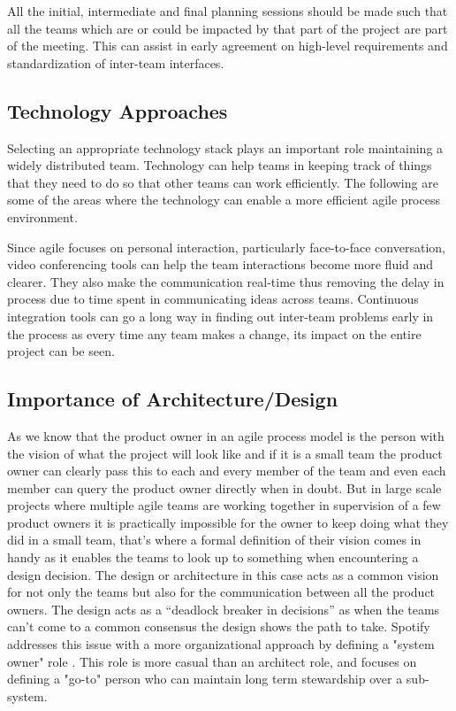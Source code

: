 All the initial, intermediate and final planning sessions should be made such that all the teams which are or could be impacted by that part of the project are part of the meeting.
This can assist in early agreement on high-level requirements and standardization of inter-team interfaces.

\subsection{Technology Approaches} \label{sec:tech_impv}
Selecting an appropriate technology stack plays an important role maintaining a widely distributed team.
Technology can help teams in keeping track of things that they need to do so that other teams can work efficiently.
The following are some of the areas where the technology can enable a more efficient agile process environment.

Since agile focuses on personal interaction, particularly face-to-face conversation, video conferencing tools can help the team interactions become more fluid and clearer.
They also make the communication real-time thus removing the delay in process due to time spent in communicating ideas across teams.
Continuous integration tools can go a long way in finding out inter-team problems early in the process as every time any team makes a change, its impact on the entire project can be seen.

\subsection{Importance of Architecture/Design}\label{sec:imp_of_dsgn}

As we know that the product owner in an agile process model is the person with the vision of what the project will look like and if it is a small team the product owner can clearly pass this to each and every member of the team and even each member can query the product owner directly when in doubt.
But in large scale projects where multiple agile teams are working together in supervision of a few product owners it is practically impossible for the owner to keep doing what they did in a small team, that’s where a formal definition of their vision comes in handy as it enables the teams to look up to something when encountering a design decision.
The design or architecture in this case acts as a common vision for not only the teams but also for the communication between all the product owners.
The design acts as a “deadlock breaker in decisions” \cite{architecureRole_article} as when the teams can’t come to a common consensus the design shows the path to take.
Spotify addresses this issue with a more organizational approach by defining a "system owner" role \cite{kniberg12}.
This role is more casual than an architect role, and focuses on defining a "go-to" person who can maintain long term stewardship over a sub-system. 

